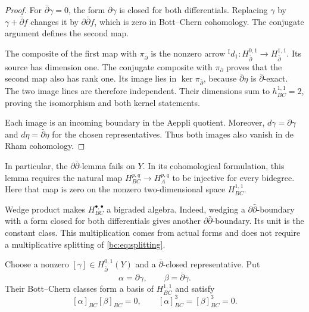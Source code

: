 \begin{proof}
For $\bar\partial\gamma=0$, the form $\partial\gamma$ is
closed for both differentials. Replacing $\gamma$ by
$\gamma+\bar\partial f$ changes it by
$\partial\bar\partial f$, which is zero in Bott--Chern
cohomology. The conjugate argument defines the second map.

The composite of the first map with $\pi_{\bar\partial}$ is
the nonzero arrow
${}^{\mathrm I}d_1:H_{\bar\partial}^{0,1}\to
H_{\bar\partial}^{1,1}$. Its source has dimension one.
The conjugate composite with $\pi_\partial$ proves that
the second map also has rank one.
Its image lies in $\ker\pi_{\bar\partial}$, because
$\bar\partial\eta$ is $\bar\partial$-exact.
The two image lines are therefore independent.
Their dimensions sum to $h_{BC}^{1,1}=2$, proving the isomorphism
and both kernel statements.

Each image is an incoming boundary in the Aeppli quotient.
Moreover, $d\gamma=\partial\gamma$ and
$d\eta=\bar\partial\eta$ for the chosen representatives.
Thus both images also vanish in de Rham cohomology.
\end{proof}

In particular, the $\partial\bar\partial$-lemma fails on $Y$.
In its cohomological formulation, this lemma requires the
natural map $H_{BC}^{p,q}\to H_A^{p,q}$ to be injective for
every bidegree. Here that map is zero on the nonzero
two-dimensional space $H_{BC}^{1,1}$.

Wedge product makes $H_{BC}^{\bullet,\bullet}$ a bigraded algebra.
Indeed, wedging a $\partial\bar\partial$-boundary with a form
closed for both differentials gives another
$\partial\bar\partial$-boundary. Its unit is the constant class.
This multiplication comes from actual forms and does not require
a multiplicative splitting of \eqref{bc:eq:splitting}.

\begin{proposition}\label{bc:prop:products}
Choose a nonzero $[\gamma]\in H_{\bar\partial}^{0,1}(Y)$
and a $\bar\partial$-closed representative. Put
\[
             \alpha=\partial\gamma,\qquad
             \beta=\bar\partial\overline\gamma.
\]
Their Bott--Chern classes form a basis of $H_{BC}^{1,1}$ and satisfy
\begin{equation}\label{bc:eq:products}
       [\alpha]_{BC}[\beta]_{BC}=0,\qquad
       [\alpha]_{BC}^3=[\beta]_{BC}^3=0.
\end{equation}
\end{proposition}

